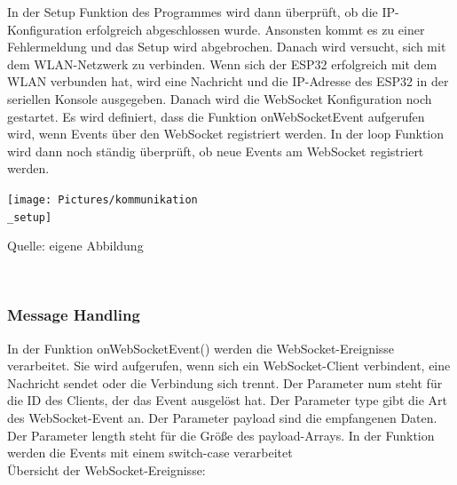 \documentclass[ngerman,12pt,a4paper]{article}
\begin{document}
	In der Setup Funktion des Programmes wird dann überprüft, ob die IP-Konfiguration erfolgreich abgeschlossen wurde. Ansonsten kommt es zu einer Fehlermeldung und das Setup wird abgebrochen. Danach wird versucht, sich mit dem WLAN-Netzwerk zu verbinden. Wenn sich der ESP32 erfolgreich mit dem WLAN verbunden hat, wird eine Nachricht und die IP-Adresse des ESP32 in der seriellen Konsole ausgegeben. Danach wird die WebSocket Konfiguration noch gestartet. Es wird definiert, dass die Funktion onWebSocketEvent aufgerufen wird, wenn Events über den WebSocket registriert werden. In der loop Funktion wird dann noch ständig überprüft, ob neue Events am WebSocket registriert werden.
	\begin{center}
		\begin{minipage}[t]{0.55\textwidth}
			\texttt{[image: Pictures/kommunikation\\\_setup]}
			\label{fig:kommunikation_setup}
			\vspace{-10pt}
			\begin{center}
				\par\small Quelle: eigene Abbildung 
			\end{center}
		\end{minipage} \\[0.75cm]
	\end{center}	
	
			\subsubsection{Message Handling}
			
	In der Funktion onWebSocketEvent() werden die WebSocket-Ereignisse verarbeitet. Sie wird aufgerufen, wenn sich ein WebSocket-Client verbindent, eine Nachricht sendet oder die Verbindung sich trennt.
	Der Parameter num steht für die ID des Clients, der das Event ausgelöst hat. Der Parameter type gibt die Art des WebSocket-Event an. Der Parameter payload sind die empfangenen Daten. Der Parameter length steht für die Größe des payload-Arrays. 
	In der Funktion werden die Events mit einem switch-case verarbeitet\\[0.5cm]
	Übersicht der WebSocket-Ereignisse:
	
\end{document}
